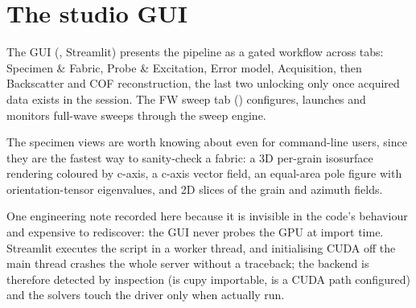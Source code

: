 \section{The studio GUI}

The GUI (, Streamlit) presents the pipeline as a
gated workflow across tabs: Specimen \& Fabric, Probe \& Excitation,
Error model, Acquisition, then Backscatter and COF reconstruction,
the last two unlocking only once acquired data exists in the
session. The FW sweep tab () configures,
launches and monitors full-wave sweeps through the sweep engine.

The specimen views are worth knowing about even for command-line
users, since they are the fastest way to sanity-check a fabric: a 3D
per-grain isosurface rendering coloured by c-axis, a c-axis vector
field, an equal-area pole figure with orientation-tensor
eigenvalues, and 2D slices of the grain and azimuth fields.

One engineering note recorded here because it is invisible in the
code's behaviour and expensive to rediscover: the GUI never probes
the GPU at import time. Streamlit executes the script in a worker
thread, and initialising CUDA off the main thread crashes the whole
server without a traceback; the backend is therefore detected by
inspection (is cupy importable, is a CUDA path configured) and the
solvers touch the driver only when actually run.
